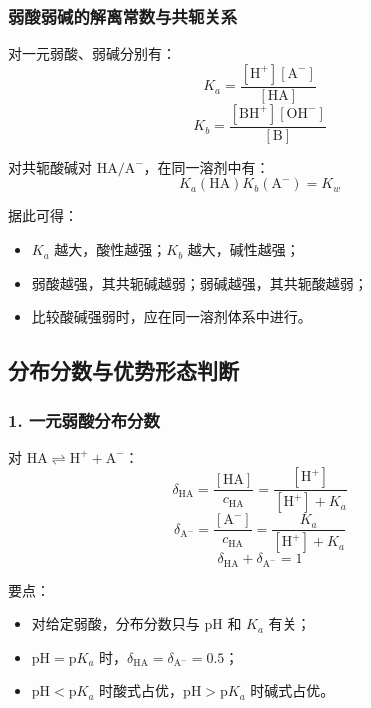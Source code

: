 \documentclass[12pt,a4paper]{article}
\numberwithin{equation}{section}
\begin{document}
\subsubsection{弱酸弱碱的解离常数与共轭关系}
对一元弱酸、弱碱分别有：
\begin{equation}
K_a=\frac{[\mathrm{H^+}][\mathrm{A^-}]}{[\mathrm{HA}]}
\end{equation}
\begin{equation}
K_b=\frac{[\mathrm{BH^+}][\mathrm{OH^-}]}{[\mathrm{B}]}
\end{equation}

对共轭酸碱对 $\mathrm{HA/A^-}$，在同一溶剂中有：
\begin{equation}
K_a(\mathrm{HA})K_b(\mathrm{A^-})=K_w
\end{equation}

据此可得：
\begin{itemize}
    \item $K_a$ 越大，酸性越强；$K_b$ 越大，碱性越强；
    \item 弱酸越强，其共轭碱越弱；弱碱越强，其共轭酸越弱；
    \item 比较酸碱强弱时，应在同一溶剂体系中进行。
\end{itemize}

\subsection{分布分数与优势形态判断}

\subsubsection{1. 一元弱酸分布分数}
对 $\mathrm{HA}\rightleftharpoons\mathrm{H^+}+\mathrm{A^-}$：
\begin{equation}
\delta_{\mathrm{HA}}=\frac{[\mathrm{HA}]}{c_{\mathrm{HA}}}=\frac{[\mathrm{H^+}]}{[\mathrm{H^+}]+K_a}
\end{equation}
\begin{equation}
\delta_{\mathrm{A^-}}=\frac{[\mathrm{A^-}]}{c_{\mathrm{HA}}}=\frac{K_a}{[\mathrm{H^+}]+K_a}
\end{equation}
\begin{equation}
\delta_{\mathrm{HA}}+\delta_{\mathrm{A^-}}=1
\end{equation}

要点：
\begin{itemize}
    \item 对给定弱酸，分布分数只与 $\mathrm{pH}$ 和 $K_a$ 有关；
    \item $\mathrm{pH}=\mathrm{p}K_a$ 时，$\delta_{\mathrm{HA}}=\delta_{\mathrm{A^-}}=0.5$；
    \item $\mathrm{pH}<\mathrm{p}K_a$ 时酸式占优，$\mathrm{pH}>\mathrm{p}K_a$ 时碱式占优。
\end{itemize}
\end{document}
